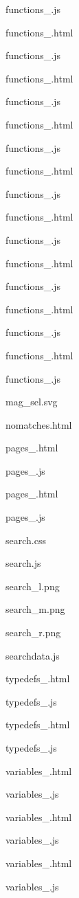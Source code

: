 \begin{DoxyItemize}
\begin{DoxyItemize}
\begin{DoxyItemize}
\begin{DoxyItemize}
\item functions\+\_.\+js
\item functions\+\_.\+html
\item functions\+\_.\+js
\item functions\+\_.\+html
\item functions\+\_.\+js
\item functions\+\_.\+html
\item functions\+\_.\+js
\item functions\+\_.\+html
\item functions\+\_.\+js
\item functions\+\_.\+html
\item functions\+\_.\+js
\item functions\+\_.\+html
\item functions\+\_.\+js
\item functions\+\_.\+html
\item functions\+\_.\+js
\item functions\+\_.\+html
\item functions\+\_.\+js
\item mag\+\_\+sel.\+svg
\item nomatches.\+html
\item pages\+\_.\+html
\item pages\+\_.\+js
\item pages\+\_.\+html
\item pages\+\_.\+js
\item search.\+css
\item search.\+js
\item search\+\_\+l.\+png
\item search\+\_\+m.\+png
\item search\+\_\+r.\+png
\item searchdata.\+js
\item typedefs\+\_.\+html
\item typedefs\+\_.\+js
\item typedefs\+\_.\+html
\item typedefs\+\_.\+js
\item variables\+\_.\+html
\item variables\+\_.\+js
\item variables\+\_.\+html
\item variables\+\_.\+js
\item variables\+\_.\+html
\item variables\+\_.\+js

\end{DoxyItemize}
\end{DoxyItemize}
\end{DoxyItemize}
\end{DoxyItemize}
